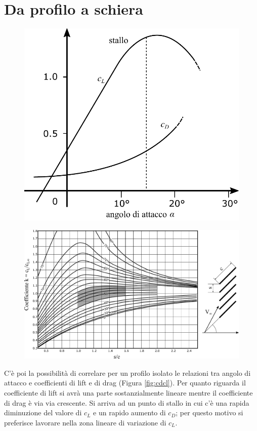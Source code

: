 \section{Da profilo a schiera} 
\begin{figure}
\centering
\begin{minipage}{.3\textwidth}
  \centering
  \includegraphics[width=.95\linewidth]{fig/cdcl.pdf}
  \label{fig:cdcl}
\end{minipage}%
\begin{minipage}{.7\textwidth}
  \centering
  \includegraphics[width=.95\linewidth]{fig/EffSchiera.pdf}
  \label{fig:EffSchiera}
\end{minipage}
\end{figure}
C'è poi la possibilità di correlare per un profilo isolato le relazioni tra angolo di attacco e coefficienti di lift e di drag (Figura \ref{fig:cdcl}). Per quanto riguarda il coefficiente di lift si avrà una parte sostanzialmente lineare mentre il coefficiente di drag è via via crescente. Si arriva ad un punto di stallo in cui c'è una rapida diminuzione del valore di $c_L$ e un rapido aumento di $c_D$; per questo motivo si preferisce lavorare nella zona lineare di variazione di $c_L$.\\
